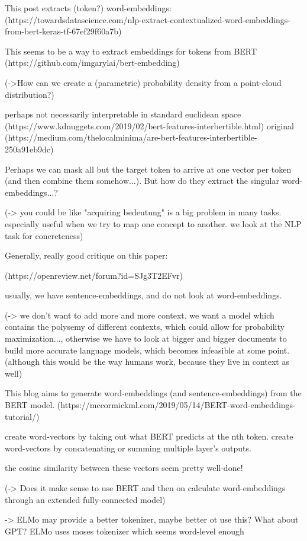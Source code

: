 \documentclass[a4paper,12pt,twoside,openright]{report}
\begin{document}
This post extracts (token?) word-embeddings: 
(https://towardsdatascience.com/nlp-extract-contextualized-word-embeddings-from-bert-keras-tf-67ef29f60a7b)

This seems to be a way to extract embeddings for tokens from BERT
(https://github.com/imgarylai/bert-embedding)

(->How can we create a (parametric) probability density from a point-cloud distribution?)

perhaps not necessarily interpretable in standard euclidean space
(https://www.kdnuggets.com/2019/02/bert-features-interbertible.html)
original (https://medium.com/thelocalminima/are-bert-features-interbertible-250a91eb9dc)

Perhaps we can mask all but the target token to arrive at one vector per token (and then combine them somehow...).
But how do they extract the singular word-embeddings...?

(-> you could be like "acquiring bedeutung" is a big problem in many tasks. especially useful when we try to map one concept to another. we look at the NLP task for concreteness)

Generally, really good critique on this paper:

(https://openreview.net/forum?id=SJg3T2EFvr)

usually, we have sentence-embeddings, and do not look at word-embeddings.

(-> we don't want to add more and more context. we want a model which contains the polysemy of different contexts, which could allow for probability maximization..., otherwise we have to look at bigger and bigger documents to build more accurate language models, which becomes infeasible at some point. (although this would be the way humans work, because they live in context as well)

This blog aims to generate word-embeddings (and sentence-embeddings) from the BERT model.
(https://mccormickml.com/2019/05/14/BERT-word-embeddings-tutorial/)

create word-vectors by taking out what BERT predicts at the nth token.
create word-vectors by concatenating or summing multiple layer's outputs.

the cosine similarity between these vectors seem pretty well-done!


(-> Does it make sense to use BERT and then on calculate word-embeddings through an extended fully-connected model)

-> ELMo may provide a better tokenizer, maybe better ot use this? What about GPT? ELMo uses moses tokenizer which seems word-level enough
\end{document}
